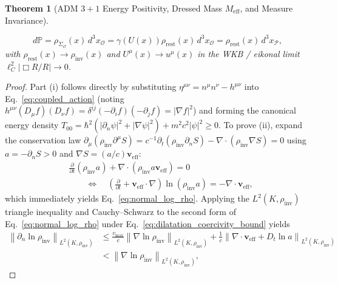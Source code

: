 \documentclass[11pt, a4paper]{article}
\newtheorem{theorem}{Theorem}[section]
\theoremstyle{definition}
\begin{document}
\begin{theorem}[ADM $3+1$ Energy Positivity, Dressed Mass $M_{\text{eff}}$, and Measure Invariance]
\begin{enumerate}[label=(\roman*)]
    \begin{equation}
    \label{eq:measure_invariance}
    d\mathbb{P} = \rho_{\Sigma_{\mathcal{O}}}(x)\,d^3x_{\mathcal{O}} = \gamma(U(x)) \rho_{\text{rest}}(x)\,d^3x_{\mathcal{O}} = \rho_{\text{rest}}(x)\,d^3x_{\mathcal{P}},
    \end{equation}
    with $\rho_{\text{rest}}(x) \to \rho_{\text{inv}}(x)$ and $U^\mu(x) \to u^\mu(x)$ in the WKB / eikonal limit $\ell_C^2 |\Box R/R| \to 0$.
\end{enumerate}
\end{theorem}

\begin{proof}
Part (i) follows directly by substituting $\eta^{\mu\nu} = n^\mu n^\nu - h^{\mu\nu}$ into Eq.~\eqref{eq:coupled_action} (noting $h^{\mu\nu}(D_\mu f)(D_\nu f) = \delta^{ij}(-\partial_i f)(-\partial_j f) = |\nabla f|^2$) and forming the canonical energy density $T_{00} = \hbar^2(|\partial_n \psi|^2 + |\nabla\psi|^2) + m^2 c^2|\psi|^2 \ge 0$. To prove (ii), expand the conservation law $\partial_\mu(\rho_{\text{inv}}\partial^\mu S) = c^{-1}\partial_t(\rho_{\text{inv}}\partial_n S) - \nabla\cdot(\rho_{\text{inv}}\nabla S) = 0$ using $a = -\partial_n S > 0$ and $\nabla S = (a/c)\mathbf{v}_{\text{eff}}$:
\begin{equation}
\begin{aligned}
&\frac{\partial}{\partial t}(\rho_{\text{inv}} a) + \nabla \cdot \left( \rho_{\text{inv}} a \mathbf{v}_{\text{eff}} \right) = 0 \\
&\qquad \Longleftrightarrow \quad \left(\frac{\partial}{\partial t} + \mathbf{v}_{\text{eff}}\cdot\nabla\right)\ln(\rho_{\text{inv}} a) = -\nabla\cdot\mathbf{v}_{\text{eff}},
\end{aligned}
\end{equation}
which immediately yields Eq.~\eqref{eq:normal_log_rho}. Applying the $L^2(K, \rho_{\text{inv}})$ triangle inequality and Cauchy--Schwarz to the second form of Eq.~\eqref{eq:normal_log_rho} under Eq.~\eqref{eq:dilatation_coercivity_bound} yields
\[
\begin{aligned}
\left\|\partial_n \ln\rho_{\text{inv}}\right\|_{L^2(K,\rho_{\text{inv}})} &\le \frac{v_{\max}}{c}\left\|\nabla\ln\rho_{\text{inv}}\right\|_{L^2(K,\rho_{\text{inv}})} + \frac{1}{c}\left\|\nabla\cdot\mathbf{v}_{\text{eff}} + D_t\ln a\right\|_{L^2(K,\rho_{\text{inv}})} \\
&< \left\|\nabla\ln\rho_{\text{inv}}\right\|_{L^2(K,\rho_{\text{inv}})},
\end{aligned}
\]

\end{proof}
\end{document}
